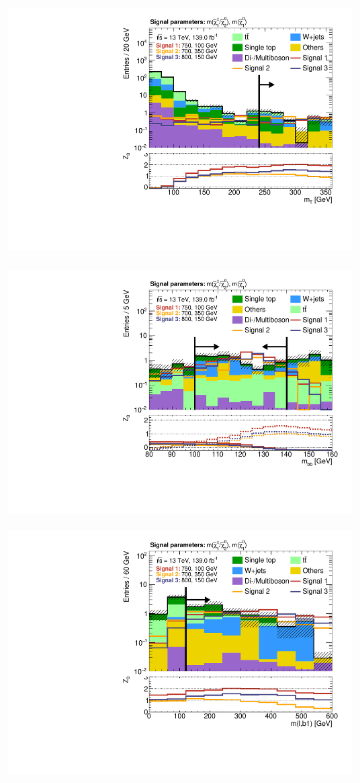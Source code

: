 \begin{figure}
\begin{subfigure}[b]{0.4\linewidth}
		\centering\includegraphics[width=\textwidth]{n1_SRHM_mct_bins/mt_both.pdf}
		\caption{\label{fig:Wh_reopt_second_round_n1_srhm_mbb_lower}}
	\end{subfigure}%
	\begin{subfigure}[b]{0.4\linewidth}
		\centering\includegraphics[width=\textwidth]{n1_SRHM_mct_bins/mbb_both.pdf}
		\caption{\label{fig:Wh_reopt_second_round_n1_srhm_mbb_upper}}
	\end{subfigure}
	\begin{subfigure}[b]{0.4\linewidth}
		\centering\includegraphics[width=\textwidth]{n1_SRHM_mct_bins/mlb1.pdf}

\end{subfigure}
\end{figure}
